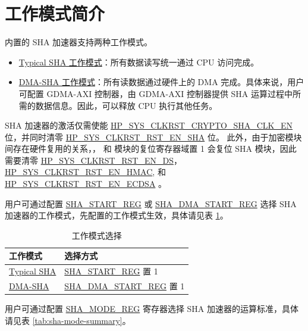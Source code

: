 \documentclass[main\_\_CN.tex]{subfiles}
\begin{document}
\section{工作模式简介}
\chipname{} 内置的 SHA 加速器支持两种工作模式。

\begin{itemize}
    \item \hyperref[sec:sha-typical-sha]{Typical SHA 工作模式}：所有数据读写统一通过 CPU 访问完成。
    \item \hyperref[sec:sha-dma-sha]{DMA-SHA 工作模式}：所有读数据通过硬件上的 DMA 完成。具体来说，用户可配置 GDMA-AXI 控制器，由 GDMA-AXI 控制器提供 SHA 运算过程中所需的数据信息。因此，可以释放 CPU 执行其他任务。
\end{itemize}

SHA 加速器的激活仅需使能 \hyperref[fielddesc:HPSYSCLKRSTCRYPTOSHACLKEN]{HP\_SYS\_CLKRST\_CRYPTO\_SHA\_CLK\_EN} 位，并同时清零 \hyperref[fielddesc:HPSYSCLKRSTRSTENSHA]{HP\_SYS\_CLKRST\_RST\_EN\_SHA} 位。 此外，由于加密模块间存在硬件复用的关系，， 和 模块的复位寄存器域置 1 会复位 SHA 模块，因此需要清零 \hyperref[fielddesc:HPSYSCLKRSTRSTENDS]{HP\_SYS\_CLKRST\_RST\_EN\_DS}， \hyperref[fielddesc:HPSYSCLKRSTRSTENHMAC]{HP\_SYS\_CLKRST\_RST\_EN\_HMAC}, 和 \hyperref[fielddesc:HPSYSCLKRSTRSTENECDSA]{HP\_SYS\_CLKRST\_RST\_EN\_ECDSA} 。


用户可通过配置 \hyperref[regdesc:SHASTARTREG]{SHA\_START\_REG} 或 \hyperref[regdesc:SHADMASTARTREG]{SHA\_DMA\_START\_REG} 选择 SHA 加速器的工作模式，先配置的工作模式生效，具体请见表 \ref{tab:sha-hash-algo-select}。

\begin{longtable}[c]{ |l|l| }
\caption{工作模式选择}
\label{tab:sha-hash-algo-select}
\\\hline
\rowcolor{lightgray}
\textbf{工作模式}      & \textbf{选择方式}\\
    \hline
    \hyperref[sec:sha-typical-sha]{Typical SHA}      &  \hyperref[regdesc:SHASTARTREG]{SHA\_START\_REG} 置 1   \\
    \hline
    \hyperref[sec:sha-dma-sha]{DMA-SHA}           &  \hyperref[regdesc:SHADMASTARTREG]{SHA\_DMA\_START\_REG} 置 1   \\
    \hline
\end{longtable}

用户可通过配置 \hyperref[regdesc:SHAMODEREG]{SHA\_MODE\_REG} 寄存器选择 SHA 加速器的运算标准，具体请见表 \ref{tab:sha-mode-summary}。
\end{document}
